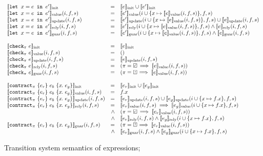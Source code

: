 \begin{figure}
\[\begin{array}{lrl}
    \\
    \sysinit{\xlet{x}{e}{e'}} & = & \sysinit{e} \cup \sysinit{e'} \\
    \sysvalue{\xlet{x}{e}{e'}}(i, f, s) & = & \sysvalue{e'}(i \cup \{ x \mapsto \sysvalue{e}(i, f, s)\}, f, s) \\
    \sysupdate{\xlet{x}{e}{e'}}(i, f, s) & = & \sysupdate{e'}(i \cup \{ x \mapsto \sysvalue{e}(i, f, s)\}, f, s) \cup \sysupdate{e}(i, f, s) \\
    \sysrely{\xlet{x}{e}{e'}}(i, f, s) & = & \sysrely{e'}(i \cup \{ x \mapsto \sysvalue{e}(i, f, s)\}, f, s) \wedge \sysrely{e}(i, f, s) \\
    \sysguar{\xlet{x}{e}{e'}}(i, f, s) & = & \sysguar{e'}(i \cup \{ x \mapsto \sysvalue{e}(i, f, s)\}, f, s) \wedge \sysguar{e}(i, f, s) \\
    \\
    \sysinit{\xcheckP{\PStatus}{e}} & = & \sysinit{e} \\
    \sysvalue{\xcheckP{\PStatus}{e}}(i, f, s) & = & () \\
    \sysupdate{\xcheckP{\PStatus}{e}}(i, f, s) & = & \sysupdate{e}(i, f, s) \\
    \sysrely{\xcheckP{\PStatus}{e}}(i, f, s) & = & (\PStatus = \PSValid \implies \sysvalue{e}(i, f, s)) \\
    \sysguar{\xcheckP{\PStatus}{e}}(i, f, s) & = & (\PStatus = \PSUnknown \implies \sysvalue{e}(i, f, s)) \\
    \\
    \sysinit{\xctr} & = & \sysinit{e_r} \cup \sysinit{e_g} \\
    \sysvalue{\xctr}(i, f, s) & = & f.x \\
    \sysupdate{\xctr}(i, f, s) & = & \sysupdate{e_r}(i, f, s) \cup \sysupdate{e_g}(i \cup \{ x \mapsto f.x \}, f, s) \\
    \sysrely{\xctr}(i, f, s) & = & \sysvalue{e_r}(i, f, s) \implies \sysvalue{e_g}(i \cup \{ x \mapsto f.x \}, f, s) \\
                            & \wedge & (\PStatus = \PSValid \implies \sysvalue{e_r}(i, f, s)) \\
                            & \wedge & \sysrely{e_r}(i, f, s) \wedge \sysrely{e_g}(i \cup \{ x \mapsto f.x \}, f, s) \\
    \sysguar{\xctr}(i, f, s) & = & (\PStatus = \PSUnknown \implies \sysvalue{e_r}(i, f, s)) \\
    & \wedge & \sysguar{e_r}(i, f, s) \wedge \sysguar{e_g}(i \cup \{ x \mapsto f.x \}, f, s) \\
\end{array}
  \]
  \caption{Transition system semantics of expressions; }
  \label{f:system-translation}
\end{figure}